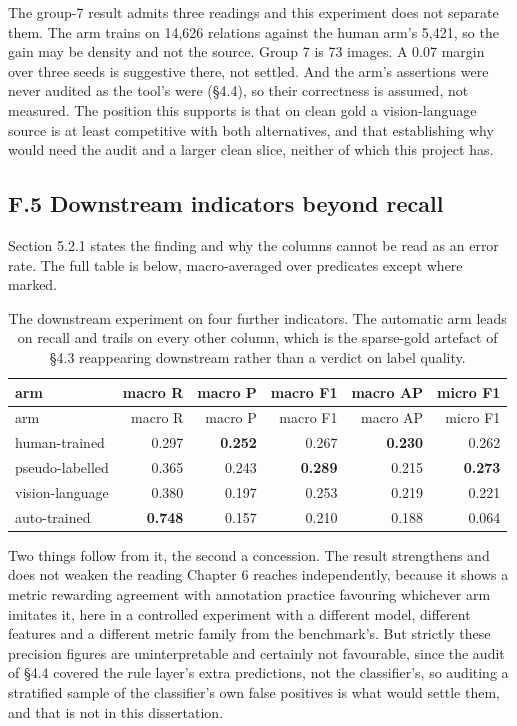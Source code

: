 The group-7 result admits three readings and this experiment does not separate them. The arm trains on 14,626 relations against the human arm's 5,421, so the gain may be density and not the source. Group 7 is 73 images. A 0.07 margin over three seeds is suggestive there, not settled. And the arm's assertions were never audited as the tool's were (\S{}4.4), so their correctness is assumed, not measured. The position this supports is that on clean gold a vision-language source is at least competitive with both alternatives, and that establishing why would need the audit and a larger clean slice, neither of which this project has.

\subsection{F.5 Downstream indicators beyond recall}

Section 5.2.1 states the finding and why the columns cannot be read as an error rate. The full table is below, macro-averaged over predicates except where marked.

\begin{center}
\setlength{\tabcolsep}{6pt}
\small
\begin{longtable}{lrrrrr}
\caption[The downstream experiment on four further indicators]{The downstream experiment on four further indicators. The automatic arm leads on recall and trails on every other column, which is the sparse-gold artefact of \S{}4.3 reappearing downstream rather than a verdict on label quality.}\\
\hline
arm & macro R & macro P & macro F1 & macro AP & micro F1 \\
\hline
\endfirsthead
\hline
arm & macro R & macro P & macro F1 & macro AP & micro F1 \\
\hline
\endhead
human-trained & 0.297 & \textbf{0.252} & 0.267 & \textbf{0.230} & 0.262 \\
pseudo-labelled & 0.365 & 0.243 & \textbf{0.289} & 0.215 & \textbf{0.273} \\
vision-language & 0.380 & 0.197 & 0.253 & 0.219 & 0.221 \\
auto-trained & \textbf{0.748} & 0.157 & 0.210 & 0.188 & 0.064 \\
\hline
\end{longtable}
\end{center}

Two things follow from it, the second a concession. The result strengthens and does not weaken the reading Chapter 6 reaches independently, because it shows a metric rewarding agreement with annotation practice favouring whichever arm imitates it, here in a controlled experiment with a different model, different features and a different metric family from the benchmark's. But strictly these precision figures are uninterpretable and certainly not favourable, since the audit of \S{}4.4 covered the rule layer's extra predictions, not the classifier's, so auditing a stratified sample of the classifier's own false positives is what would settle them, and that is not in this dissertation.

